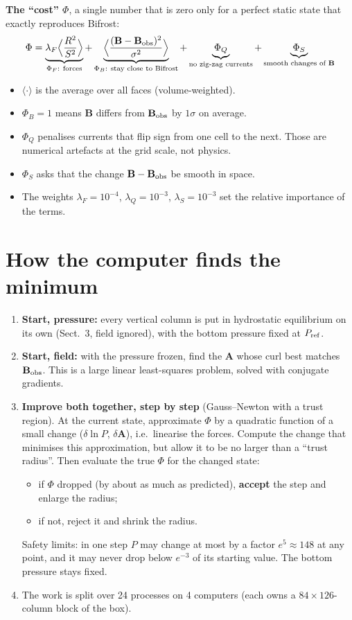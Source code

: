 \documentclass[10pt]{extarticle}
\newcommand{\B}{\mathbf B}\newcommand{\J}{\mathbf J}\newcommand{\Bo}{\mathbf B_{\rm obs}}
\begin{document}
\textbf{The ``cost'' $\Phi$}, a single number that is zero only for a perfect static state that exactly reproduces Bifrost:
\[
\Phi=\underbrace{\lambda_F\Big\langle\frac{R^2}{S^2}\Big\rangle}_{\Phi_F:\ \text{forces}}
+\underbrace{\Big\langle\frac{(\B-\Bo)^2}{\sigma^2}\Big\rangle}_{\Phi_B:\ \text{stay close to Bifrost}}
+\underbrace{\Phi_Q}_{\text{no zig-zag currents}}
+\underbrace{\Phi_S}_{\text{smooth changes of }\B}
\]
\begin{itemize}
\item $\langle\cdot\rangle$ is the average over all faces (volume-weighted).
\item $\Phi_B=1$ means $\B$ differs from $\Bo$ by $1\sigma$ on average.
\item $\Phi_Q$ penalises currents that flip sign from one cell to the next. Those are numerical artefacts at the grid scale, not physics.
\item $\Phi_S$ asks that the change $\B-\Bo$ be smooth in space.
\item The weights $\lambda_F=10^{-4}$, $\lambda_Q=10^{-3}$, $\lambda_S=10^{-3}$ set the relative importance of the terms.
\end{itemize}

\section{How the computer finds the minimum}
\begin{enumerate}
\item \textbf{Start, pressure:} every vertical column is put in hydrostatic equilibrium on its own (Sect.~3, field ignored), with the bottom pressure fixed at $P_{\rm ref}$.
\item \textbf{Start, field:} with the pressure frozen, find the $\mathbf A$ whose curl best matches $\Bo$. This is a large linear least-squares problem, solved with conjugate gradients.
\item \textbf{Improve both together, step by step} (Gauss--Newton with a trust region). At the current state, approximate $\Phi$ by a quadratic function of a small change ($\delta\ln P$, $\delta\mathbf A$), i.e.\ linearise the forces. Compute the change that minimises this approximation, but allow it to be no larger than a ``trust radius''. Then evaluate the true $\Phi$ for the changed state:
  \begin{itemize}
  \item if $\Phi$ dropped (by about as much as predicted), \textbf{accept} the step and enlarge the radius;
  \item if not, reject it and shrink the radius.
  \end{itemize}
  Safety limits: in one step $P$ may change at most by a factor $e^5\approx148$ at any point, and it may never drop below $e^{-3}$ of its starting value. The bottom pressure stays fixed.
\item The work is split over 24 processes on 4 computers (each owns a $84\times126$-column block of the box).
\end{enumerate}
\end{document}
